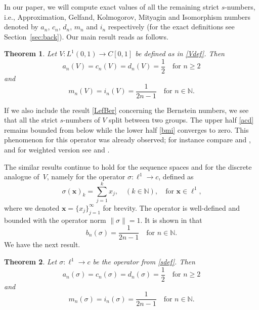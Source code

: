 \documentclass[10pt,reqno]{amsart}
\def\N{\mathbb{N}}
\newtheorem{theorem}{Theorem}[section]
\numberwithin{equation}{section}
\def\LI{{L^1(0,1)}}
\def\li{{\ell^1}}
\def\LInf{{C[0,1]}}
\def\linf{{c}}
\def\vx{\mathbf{x}}
\begin{document}
In our paper, we will compute exact values of all the remaining strict $s$-numbers, i.e.,
Approximation, Gelfand, Kolmogorov, Mityagin and Isomorphism numbers
denoted by
$a_n$, $c_n$, $d_n$, $m_n$ and $i_n$ respectively
(for the exact definitions see Section~\ref{sec:back}).
Our main result reads as follows.

\begin{theorem} \label{thm:main}
Let $V\colon \LI \to \LInf$ be defined as in \eqref{Vdef}.
Then
\begin{equation} \label{acd}
	a_n(V) = c_n(V) = d_n(V) = \frac{1}{2}
	\quad\text{for $n\ge 2$}
\end{equation}
and%
\begin{equation} \label{bmi}
	m_n(V) = i_n(V) = \frac{1}{2n-1}
	\quad\text{for $n\in\N$}.
\end{equation}
\end{theorem}

If we also include the result \eqref{LefBer} concerning the Bernstein numbers,
we see that all the strict $s$-numbers of $V$
split between two groups. The upper half \eqref{acd} remains bounded from
below while the lower half \eqref{bmi} converges to zero.
This phenomenon for this operator was already observed;
for instance compare \citep{BS} and \citep{BG},
and for weighted version see
\citep{ELJMAA} and \citep{ELMathNachr}.

The similar results continue to hold for the sequence spaces and for the
discrete analogue of~$V$, namely for the operator
$\sigma\colon \li \to \linf$,
defined as
\begin{equation} \label{sdef}
	\sigma(\vx)_k = \sum_{j=1}^k x_j,
		\quad (k\in\N),
		\quad\text{for $\vx \in\li$,}
\end{equation}
where we denoted $\vx = \{x_j\}_{j=1}^\infty$ for brevity.
The operator is well-defined and bounded with the operator norm $\|\sigma\|=1$.
It is shown in \citep[Theorem 3.2]{Lef17} that
\begin{equation*}
		b_n(\sigma) = \frac{1}{2n-1}
		\quad\text{for $n\in\N$.}
\end{equation*}
We have the next result.

\begin{theorem} \label{thm:discr}
Let $\sigma\colon \li\to \linf$ be the operator from \eqref{sdef}.
Then
\begin{equation*}
	a_n(\sigma) = c_n(\sigma) = d_n(\sigma) = \frac{1}{2}
	\quad\text{for $n\ge 2$}
\end{equation*}
and%
\begin{equation*}
	m_n(\sigma) = i_n(\sigma) = \frac{1}{2n-1}
	\quad\text{for $n\in\N$}.
\end{equation*}
\end{theorem}
\end{document}

